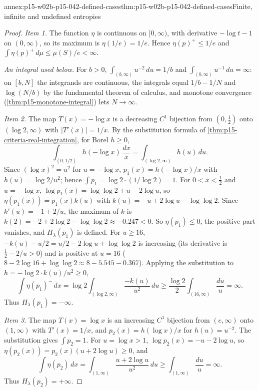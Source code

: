 \begin{annexitem}{annex:p15-w02b-p15-042-defined-cases}{thm:p15-w02b-p15-042-defined-cases}{Finite, infinite and undefined entropies}
\begin{proof}
\emph{Item 1.} The function \(\eta\) is continuous on \([0,\infty)\), with
derivative \(-\log t-1\) on \((0,\infty)\), so its maximum is
\(\eta(1/e)=1/e\). Hence \(\eta(p)^+\leq1/e\) and
\(\int\eta(p)^+\,d\mu\leq\mu(S)/e<\infty\).

\emph{An integral used below.} For \(b>0\), \(\int_{(b,\infty)}u^{-2}\,du=1/b\)
and \(\int_{(b,\infty)}u^{-1}\,du=\infty\): on \([b,N]\) the integrands are
continuous, the integrals equal \(1/b-1/N\) and \(\log(N/b)\) by the
fundamental theorem of calculus, and monotone convergence
(\cref{thm:p15-monotone-integral}) lets \(N\to\infty\).

\emph{Item 2.} The map \(T(x)=-\log x\) is a decreasing \(C^1\) bijection
from \((0,\tfrac12)\) onto \((\log2,\infty)\) with \(|T'(x)|=1/x\). By the
substitution formula of \cref{thm:p15-criteria-real-integration}, for Borel
\(h\geq0\),
\[
 \int_{(0,1/2)}h(-\log x)\,\frac{dx}{x}=\int_{(\log2,\infty)}h(u)\,du .
\]
Since \((\log x)^2=u^2\) for \(u=-\log x\), \(p_1(x)=h(-\log x)/x\) with
\(h(u)=\log2/u^2\); hence \(\int p_1=\log2\cdot(1/\log2)=1\). For
\(0<x<\tfrac12\) and \(u=-\log x\),
\(\log p_1(x)=\log\log2+u-2\log u\), so \(\eta(p_1(x))=p_1(x)k(u)\) with
\(k(u)=-u+2\log u-\log\log2\). Since \(k'(u)=-1+2/u\), the maximum of
\(k\) is \(k(2)=-2+2\log2-\log\log2\approx-0.247<0\). So
\(\eta(p_1)\leq0\), the positive part vanishes, and \(H_\lambda(p_1)\) is
defined. For \(u\geq16\),
\(-k(u)-u/2=u/2-2\log u+\log\log2\) is increasing (its derivative is
\(\tfrac12-2/u>0\)) and is positive at \(u=16\)
(\(8-2\log16+\log\log2\approx8-5.545-0.367\)). Applying the substitution
to \(h=-\log2\cdot k(u)/u^2\geq0\),
\[
 \int\eta(p_1)^-\,dx=\log2\int_{(\log2,\infty)}\frac{-k(u)}{u^2}\,du
   \geq\frac{\log2}2\int_{(16,\infty)}\frac{du}u=\infty .
\]
Thus \(H_\lambda(p_1)=-\infty\).

\emph{Item 3.} The map \(T(x)=\log x\) is an increasing \(C^1\) bijection
from \((e,\infty)\) onto \((1,\infty)\) with \(T'(x)=1/x\), and
\(p_2(x)=h(\log x)/x\) for \(h(u)=u^{-2}\). The substitution gives
\(\int p_2=1\). For \(u=\log x>1\), \(\log p_2(x)=-u-2\log u\), so
\(\eta(p_2(x))=p_2(x)(u+2\log u)\geq0\), and
\[
 \int\eta(p_2)\,dx=\int_{(1,\infty)}\frac{u+2\log u}{u^2}\,du
   \geq\int_{(1,\infty)}\frac{du}u=\infty .
\]
Thus \(H_\lambda(p_2)=+\infty\).


\end{proof}
\end{annexitem}

